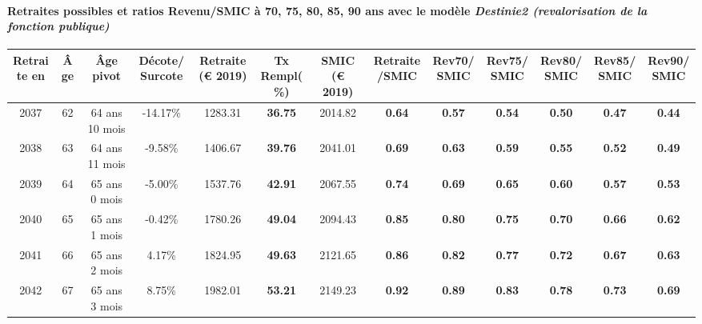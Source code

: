 \paragraph{Retraites possibles et ratios Revenu/SMIC à 70, 75, 80, 85, 90 ans avec le modèle \emph{Destinie2 (revalorisation de la fonction publique)}}  
 
{ \scriptsize \begin{center} 
\begin{tabular}[htb]{|c|c||c|c||c|c||c||c|c|c|c|c|c|} 
\hline 
 Retraite en &  Âge &  Âge pivot &  Décote/Surcote &  Retraite (\euro{} 2019) &  Tx Rempl(\%) &  SMIC (\euro{} 2019) &  Retraite/SMIC &  Rev70/SMIC &  Rev75/SMIC &  Rev80/SMIC &  Rev85/SMIC &  Rev90/SMIC \\ 
\hline \hline 
 2037 &  62 &  64 ans 10 mois &  -14.17\% &  1283.31 &  {\bf 36.75} &  2014.82 &  {\bf {\color{red} 0.64}} &  {\bf {\color{red} 0.57}} &  {\bf {\color{red} 0.54}} &  {\bf {\color{red} 0.50}} &  {\bf {\color{red} 0.47}} &  {\bf {\color{red} 0.44}} \\ 
\hline 
 2038 &  63 &  64 ans 11 mois &  -9.58\% &  1406.67 &  {\bf 39.76} &  2041.01 &  {\bf {\color{red} 0.69}} &  {\bf {\color{red} 0.63}} &  {\bf {\color{red} 0.59}} &  {\bf {\color{red} 0.55}} &  {\bf {\color{red} 0.52}} &  {\bf {\color{red} 0.49}} \\ 
\hline 
 2039 &  64 &  65 ans 0 mois &  -5.00\% &  1537.76 &  {\bf 42.91} &  2067.55 &  {\bf {\color{red} 0.74}} &  {\bf {\color{red} 0.69}} &  {\bf {\color{red} 0.65}} &  {\bf {\color{red} 0.60}} &  {\bf {\color{red} 0.57}} &  {\bf {\color{red} 0.53}} \\ 
\hline 
 2040 &  65 &  65 ans 1 mois &  -0.42\% &  1780.26 &  {\bf 49.04} &  2094.43 &  {\bf {\color{red} 0.85}} &  {\bf {\color{red} 0.80}} &  {\bf {\color{red} 0.75}} &  {\bf {\color{red} 0.70}} &  {\bf {\color{red} 0.66}} &  {\bf {\color{red} 0.62}} \\ 
\hline 
 2041 &  66 &  65 ans 2 mois &  4.17\% &  1824.95 &  {\bf 49.63} &  2121.65 &  {\bf {\color{red} 0.86}} &  {\bf {\color{red} 0.82}} &  {\bf {\color{red} 0.77}} &  {\bf {\color{red} 0.72}} &  {\bf {\color{red} 0.67}} &  {\bf {\color{red} 0.63}} \\ 
\hline 
 2042 &  67 &  65 ans 3 mois &  8.75\% &  1982.01 &  {\bf 53.21} &  2149.23 &  {\bf {\color{red} 0.92}} &  {\bf {\color{red} 0.89}} &  {\bf {\color{red} 0.83}} &  {\bf {\color{red} 0.78}} &  {\bf {\color{red} 0.73}} &  {\bf {\color{red} 0.69}} \\ 
\hline 
\hline 
\end{tabular} 
\end{center} } 

